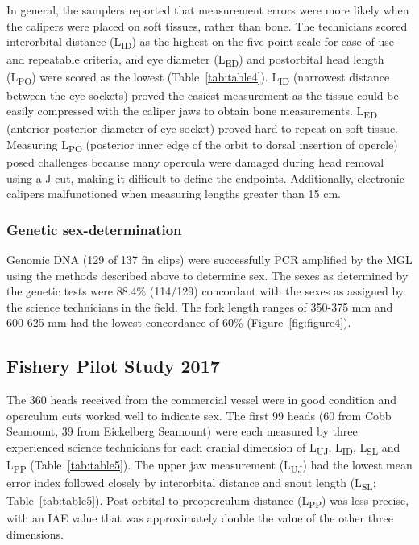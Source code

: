 \documentclass[12pt]{article}\usepackage[]{graphicx}\usepackage[]{color}
\begin{document}
In general, the samplers reported that measurement errors were more likely when the calipers were placed on soft tissues, rather than bone. The technicians scored interorbital distance (L\textsubscript{ID}) as the highest on the five point scale for ease of use and repeatable criteria, and eye diameter (L\textsubscript{ED}) and postorbital head length (L\textsubscript{PO}) were scored as the lowest (Table~\ref{tab:table4}). L\textsubscript{ID} (narrowest distance between the eye sockets) proved the easiest measurement as the tissue could be easily compressed with the caliper jaws to obtain bone measurements. L\textsubscript{ED} (anterior-posterior diameter of eye socket) proved hard to repeat on soft tissue. Measuring L\textsubscript{PO} (posterior inner edge of the orbit to dorsal insertion of opercle) posed challenges because many opercula were damaged during head removal using a J-cut, making it difficult to define the endpoints. Additionally, electronic calipers malfunctioned when measuring lengths greater than 15 cm.

\hypertarget{genetic-sex-determination}{%
\subsubsection{Genetic sex-determination}\label{genetic-sex-determination}}

Genomic DNA (129 of 137 fin clips) were successfully PCR amplified by the MGL using the methods described above to determine sex. The sexes as determined by the genetic tests were 88.4\% (114/129) concordant with the sexes as assigned by the science technicians in the field. The fork length ranges of 350-375 mm and 600-625 mm had the lowest concordance of 60\% (Figure~\ref{fig:figure4}).

\hypertarget{fishery-pilot-study-2017-1}{%
\subsection{Fishery Pilot Study 2017}\label{fishery-pilot-study-2017-1}}

The 360 heads received from the commercial vessel were in good condition and operculum cuts worked well to indicate sex. The first 99 heads (60 from Cobb Seamount, 39 from Eickelberg Seamount) were each measured by three experienced science technicians for each cranial dimension of L\textsubscript{UJ}, L\textsubscript{ID}, L\textsubscript{SL} and L\textsubscript{PP} (Table~\ref{tab:table5}). The upper jaw measurement (L\textsubscript{UJ}) had the lowest mean error index followed closely by interorbital distance and snout length (L\textsubscript{SL}; Table~\ref{tab:table5}). Post orbital to preoperculum distance (L\textsubscript{PP}) was less precise, with an IAE value that was approximately double the value of the other three dimensions.
\end{document}
